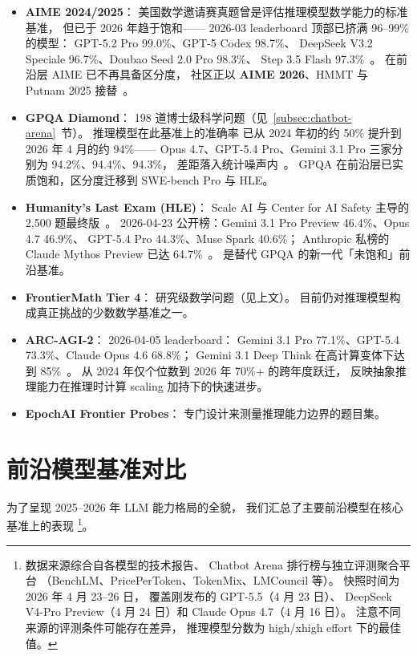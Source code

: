 \begin{itemize}[noitemsep]
  \item \textbf{AIME 2024/2025}：
        美国数学邀请赛真题曾是评估推理模型数学能力的标准基准，
        但已于 2026 年趋于饱和——
        2026-03 leaderboard 顶部已挤满 96--99\% 的模型：
        GPT-5.2 Pro 99.0\%、GPT-5 Codex 98.7\%、
        DeepSeek V3.2 Speciale 96.7\%、Doubao Seed 2.0 Pro 98.3\%、
        Step 3.5 Flash 97.3\%~\cite{ppt2026aime25}。
        在前沿层 AIME 已不再具备区分度，
        社区正以 \textbf{AIME 2026}、HMMT 与 Putnam 2025 接替~\cite{morphllm2026deepseekv4}。
  \item \textbf{GPQA Diamond}：
        198 道博士级科学问题（见~\ref{subsec:chatbot-arena}~节）。
        推理模型在此基准上的准确率
        已从 2024 年初的约 50\% 提升到 2026 年 4 月的约 94\%——
        Opus 4.7、GPT-5.4 Pro、Gemini 3.1 Pro 三家分别为 94.2\%、94.4\%、94.3\%，
        差距落入统计噪声内~\cite{buildfast2026opus47}。
        GPQA 在前沿层已实质饱和，区分度迁移到 SWE-bench Pro 与 HLE。
  \item \textbf{Humanity's Last Exam (HLE)}：
        Scale AI 与 Center for AI Safety 主导的 2,500 题最终版~\cite{hle2026final}。
        2026-04-23 公开榜：Gemini 3.1 Pro Preview 46.4\%、Opus 4.7 46.9\%、
        GPT-5.4 Pro 44.3\%、Muse Spark 40.6\%；
        Anthropic 私榜的 Claude Mythos Preview 已达 64.7\%~\cite{ppt2026hle}。
        是替代 GPQA 的新一代「未饱和」前沿基准。
  \item \textbf{FrontierMath Tier 4}：
        研究级数学问题（见上文）。
        目前仍对推理模型构成真正挑战的少数数学基准之一。
  \item \textbf{ARC-AGI-2}：
        2026-04-05 leaderboard：
        Gemini 3.1 Pro 77.1\%、GPT-5.4 73.3\%、Claude Opus 4.6 68.8\%；
        Gemini 3.1 Deep Think 在高计算变体下达到 85\%~\cite{benchlm2026arcagi2}。
        从 2024 年仅个位数到 2026 年 70\%+ 的跨年度跃迁，
        反映抽象推理能力在推理时计算 scaling 加持下的快速进步。
  \item \textbf{EpochAI Frontier Probes}：
        专门设计来测量推理能力边界的题目集。
\end{itemize}

\section{前沿模型基准对比}
\label{sec:benchmark-comparison}

为了呈现 2025--2026 年 LLM 能力格局的全貌，
我们汇总了主要前沿模型在核心基准上的表现%
\footnote{数据来源综合自各模型的技术报告、
Chatbot Arena 排行榜与独立评测聚合平台
（BenchLM、PricePerToken、TokenMix、LMCouncil 等）。
快照时间为 2026 年 4 月 23--26 日，
覆盖刚发布的 GPT-5.5（4 月 23 日）、
DeepSeek V4-Pro Preview（4 月 24 日）和
Claude Opus 4.7（4 月 16 日）。
注意不同来源的评测条件可能存在差异，
推理模型分数为 high/xhigh effort 下的最佳值。}。

